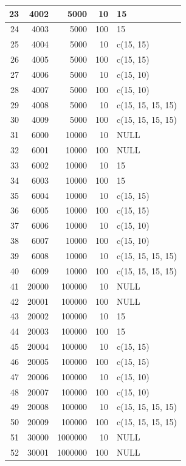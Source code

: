 \documentclass[11pt]{report}
\begin{document}
\begin{longtable}{|r|r|r|r|l|}
\hline
23 & 4002 & 5000 & 10 & 15 \\ 
\hline
24 & 4003 & 5000 & 100 & 15 \\ 
\hline
25 & 4004 & 5000 & 10 & c(15, 15) \\ 
\hline
26 & 4005 & 5000 & 100 & c(15, 15) \\ 
\hline
27 & 4006 & 5000 & 10 & c(15, 10) \\ 
\hline
28 & 4007 & 5000 & 100 & c(15, 10) \\ 
\hline
29 & 4008 & 5000 & 10 & c(15, 15, 15, 15) \\
\hline
30 & 4009 & 5000 & 100 & c(15, 15, 15, 15) \\ 
\hline
\hline
31 & 6000 & 10000 & 10 & NULL \\ 
\hline
32 & 6001 & 10000 & 100 & NULL \\ 
\hline
33 & 6002 & 10000 & 10 & 15 \\ 
\hline
34 & 6003 & 10000 & 100 & 15 \\ 
\hline
35 & 6004 & 10000 & 10 & c(15, 15) \\ 
\hline
36 & 6005 & 10000 & 100 & c(15, 15) \\ 
\hline
37 & 6006 & 10000 & 10 & c(15, 10) \\ 
\hline
38 & 6007 & 10000 & 100 & c(15, 10) \\ 
\hline
39 & 6008 & 10000 & 10 & c(15, 15, 15, 15) \\ 
\hline
40 & 6009 & 10000 & 100 & c(15, 15, 15, 15) \\ 
\hline
\hline
41 & 20000 & 100000 & 10 & NULL \\ 
\hline
42 & 20001 & 100000 & 100 & NULL \\ 
\hline
43 & 20002 & 100000 & 10 & 15 \\
\hline
44 & 20003 & 100000 & 100 & 15 \\ 
\hline
45 & 20004 & 100000 & 10 & c(15, 15) \\ 
\hline
46 & 20005 & 100000 & 100 & c(15, 15) \\ 
\hline
47 & 20006 & 100000 & 10 & c(15, 10) \\ 
\hline
48 & 20007 & 100000 & 100 & c(15, 10) \\ 
\hline
49 & 20008 & 100000 & 10 & c(15, 15, 15, 15) \\ 
\hline
50 & 20009 & 100000 & 100 & c(15, 15, 15, 15) \\ 
\hline
\hline
51 & 30000 & 1000000 & 10 & NULL \\ 
\hline
52 & 30001 & 1000000 & 100 & NULL \\ 

\end{longtable}
\end{document}
